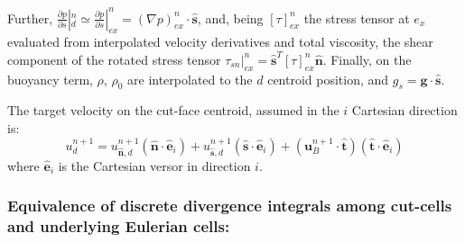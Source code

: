 \documentclass[12pt]{article}
\begin{document}
Further, $\frac{\partial p}{\partial s}  |_d^n \simeq \frac{\partial p}{\partial s} |_{ex}^n = (\nabla p)_{ex}^n \cdot \hat{\mathbf{s}}$,
and, being $[ \tau ]_{ex}^n$ the stress tensor at $e_x$ evaluated from interpolated velocity derivatives and total viscosity, the shear component of the rotated stress tensor $\tau_{sn} |_{ex}^n = \hat{\mathbf{s}}^T [ \tau ]_{ex}^n \hat{\mathbf{n}}$. Finally, on the buoyancy term, $\rho$, $\rho_0$ are interpolated to the $d$ centroid position,  and $g_s = \mathbf{g} \cdot \hat{\mathbf{s}}$.


The target velocity on the cut-face centroid, assumed in the $i$ Cartesian direction is:
%
\begin{equation}
   u_d^{n+1} = u_{\hat{\mathbf{n}},d}^{n+1} (\hat{\mathbf{n}} \cdot \hat{\mathbf{e}}_i) + u_{\hat{\mathbf{s}},d}^{n+1} (\hat{\mathbf{s}} \cdot \hat{\mathbf{e}}_i) + (\mathbf{u}_{B}^{n+1} \cdot \hat{\mathbf{t}})(\hat{\mathbf{t}} \cdot \hat{\mathbf{e}}_i)
\end{equation}
%
where $\hat{\mathbf{e}}_i$ is the Cartesian versor in direction $i$.

\subsubsection{Equivalence of discrete divergence integrals among cut-cells and underlying Eulerian cells:}
\end{document}
